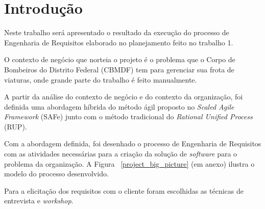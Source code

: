 \chapter[Introdução]{Introdução}
  
  
  Neste trabalho será apresentado o resultado da execução do processo de Engenharia de Requisitos elaborado no
  planejamento feito no trabalho 1.
  
  O contexto de negócio que norteia o projeto é o problema que o Corpo de Bombeiros do Distrito Federal (CBMDF)
  tem para gerenciar sua frota de viaturas, onde grande parte do trabalho é feito manualmente.
  
  A partir da análise do contexto de negócio e do contexto da organização, foi definida uma abordagem híbrida do método
  ágil proposto no \textit{Scaled Agile Framework} (SAFe) junto com o método tradicional do \textit{Rational Unified Process} (RUP).
  
  Com a abordagem definida, foi desenhado o processo de Engenharia de Requisitos com as atividades necessárias para a criação da
  solução de \textit{software} para o problema da organização. A Figura ~\ref{project_big_picture} (em anexo) ilustra o modelo do
  processo desenvolvido.
  
  Para a elicitação dos requisitos com o cliente foram escolhidas as técnicas de entrevista e \textit{workshop}.
  
  \vfill
  
  